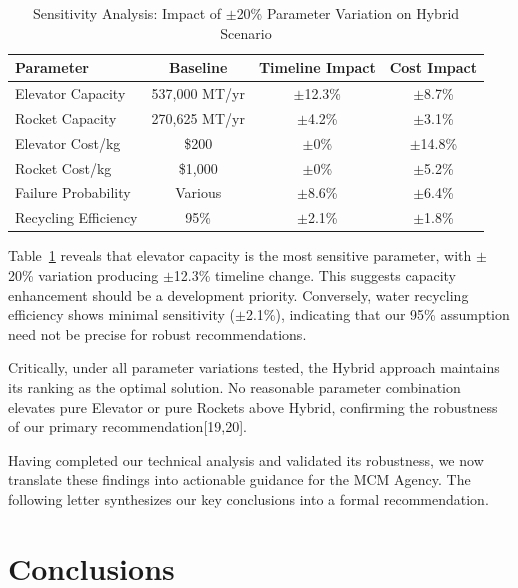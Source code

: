 \documentclass[12pt]{article}
\begin{document}
	\begin{table}[H]
		\centering
		\caption{Sensitivity Analysis: Impact of $\pm$20\% Parameter Variation on Hybrid Scenario}
		\label{tab:sensitivity}
		\begin{tabular}{lccc}
			\toprule
			\textbf{Parameter} & \textbf{Baseline} & \textbf{Timeline Impact} & \textbf{Cost Impact} \\
			\midrule
			Elevator Capacity & 537,000 MT/yr & $\pm$12.3\% & $\pm$8.7\% \\
			Rocket Capacity & 270,625 MT/yr & $\pm$4.2\% & $\pm$3.1\% \\
			Elevator Cost/kg & \$200 & $\pm$0\% & $\pm$14.8\% \\
			Rocket Cost/kg & \$1,000 & $\pm$0\% & $\pm$5.2\% \\
			Failure Probability & Various & $\pm$8.6\% & $\pm$6.4\% \\
			Recycling Efficiency & 95\% & $\pm$2.1\% & $\pm$1.8\% \\
			\bottomrule
		\end{tabular}
	\end{table}
	
	Table~\ref{tab:sensitivity} reveals that elevator capacity is the most sensitive parameter, with $\pm$20\% variation producing $\pm$12.3\% timeline change. This suggests capacity enhancement should be a development priority. Conversely, water recycling efficiency shows minimal sensitivity ($\pm$2.1\%), indicating that our 95\% assumption need not be precise for robust recommendations.
	
	Critically, under all parameter variations tested, the Hybrid approach maintains its ranking as the optimal solution. No reasonable parameter combination elevates pure Elevator or pure Rockets above Hybrid, confirming the robustness of our primary recommendation[19,20].
	
	Having completed our technical analysis and validated its robustness, we now translate these findings into actionable guidance for the MCM Agency. The following letter synthesizes our key conclusions into a formal recommendation.
	

	
\section{Conclusions}
\end{document}
